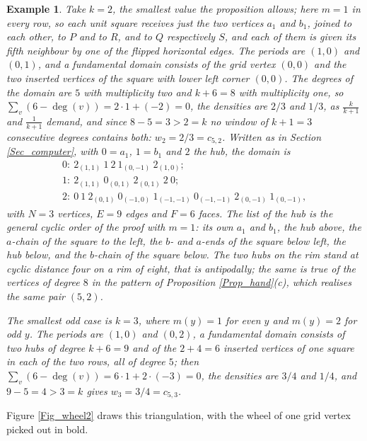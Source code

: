 \documentclass[10pt,a4paper]{article}
\newtheorem{example}[theorem]{Example}
\begin{document}
\begin{example}
\label{Ex_wheel2}Take $k=2$, the smallest value the proposition allows; here $m=1$ in every row, so
each unit square receives just the two vertices $a_{1}$ and $b_{1}$, joined to each other, to $P$ and
to $R$, and to $Q$ respectively $S$, and each of them is given its fifth neighbour by one of the
flipped horizontal edges. The periods are $(1,0)$ and $(0,1)$, and a fundamental domain consists of
the grid vertex $(0,0)$ and the two inserted vertices of the square with lower left corner $(0,0)$.
The degrees of the domain are $5$ with multiplicity two and $k+6=8$ with multiplicity one, so
$\sum_{v}(6-\deg (v))=2\cdot 1+(-2)=0$, the densities are $2/3$ and $1/3$, as $\frac{k}{k+1}$ and
$\frac{1}{k+1}$ demand, and since $8-5=3>2=k$ no window of $k+1=3$ consecutive degrees contains both:
$w_{2}=2/3=c_{5,2}$. Written as in Section \ref{Sec_computer}, with $0=a_{1}$, $1=b_{1}$ and $2$ the
hub, the domain is
\[
\begin{array}{l}
0:\ 2_{(1,1)}\ 1\ 2\ 1_{(0,-1)}\ 2_{(1,0)};\\
1:\ 2_{(1,1)}\ 0_{(0,1)}\ 2_{(0,1)}\ 2\ 0;\\
2:\ 0\ 1\ 2_{(0,1)}\ 0_{(-1,0)}\ 1_{(-1,-1)}\ 0_{(-1,-1)}\ 2_{(0,-1)}\ 1_{(0,-1)},
\end{array}
\]
with $N=3$ vertices, $E=9$ edges and $F=6$ faces. The list of the hub is the general cyclic order of
the proof with $m=1$: its own $a_{1}$ and $b_{1}$, the hub above, the $a$-chain of the square to the
left, the $b$- and $a$-ends of the square below left, the hub below, and the $b$-chain of the square
below. The two hubs on the rim stand at cyclic distance four on a rim of eight, that is antipodally;
the same is true of the vertices of degree $8$ in the pattern of Proposition \ref{Prop_hand}(c), which
realises the same pair $(5,2)$.

The smallest odd case is $k=3$, where $m(y)=1$ for even $y$ and $m(y)=2$ for odd $y$. The periods are
$(1,0)$ and $(0,2)$, a fundamental domain consists of two hubs of degree $k+6=9$ and of the
$2+4=6$ inserted vertices of one square in each of the two rows, all of degree $5$; then
$\sum_{v}(6-\deg (v))=6\cdot 1+2\cdot (-3)=0$, the densities are $3/4$ and $1/4$, and $9-5=4>3=k$
gives $w_{3}=3/4=c_{5,3}$.
\end{example}

Figure \ref{Fig_wheel2} draws this triangulation, with the wheel of one grid vertex
picked out in bold.
\end{document}
